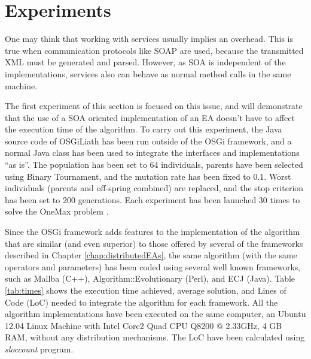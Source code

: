 \section{Experiments}
One may think that working with services usually implies an overhead. This is true when communication protocols like SOAP are used, because the transmitted XML must be generated and parsed. However, as SOA is independent of the implementations, services also can behave as normal method calls in the same machine.


The first experiment of this section is focused on this issue, and will demonstrate that the use of a SOA oriented implementation of an EA doesn't have to affect the execution time of the algorithm. To carry out this experiment, the Java source code of OSGiLiath has been run outside of the OSGi framework, and a normal Java class has been used to integrate the interfaces and implementations ``as is''. The population has been set to 64 individuals, parents have been selected using Binary Tournament, and the mutation rate has been fixed to 0.1. Worst individuals (parents and off-spring combined) are replaced, and the stop criterion has been set to 200 generations. Each experiment has been launched 30 times to solve the OneMax problem \cite{SchafferOnemax91}.



Since the OSGi framework adds features to the implementation of the algorithm that are similar (and even superior) to those offered by several of the frameworks described in Chapter \ref{chap:distributedEAs}, the same algorithm (with the same operators and parameters) has been coded using several well known frameworks, such as Mallba (C++), Algorithm::Evolutionary (Perl), and ECJ (Java). Table \ref{tab:times} shows the execution time achieved, average solution, and Lines of Code (LoC) needed to integrate the algorithm for each framework. All the algorithm implementations have been executed on the same computer, an Ubuntu 12.04 Linux Machine with Intel Core2 Quad CPU Q8200 @ 2.33GHz, 4 GB RAM, without any distribution mechanisms. The LoC have been calculated using {\em sloccount} program.






